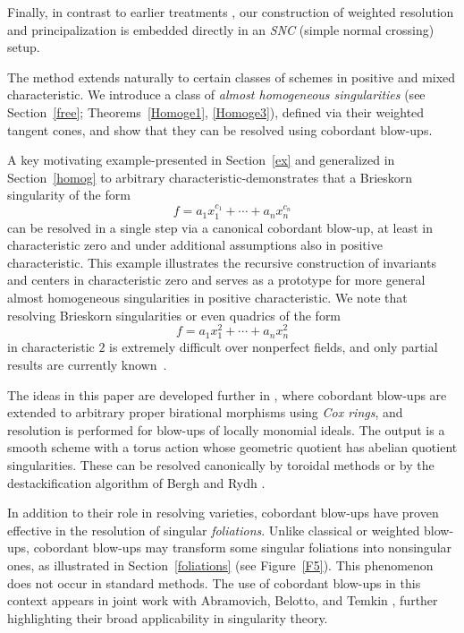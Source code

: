 \documentclass{amsart}
\begin{document}
Finally, in contrast to earlier treatments \cite{Marzo-McQuillan, ATW-weighted}, our construction of weighted resolution and principalization is embedded directly in an \emph{SNC} (simple normal crossing) setup.

The method extends naturally to certain classes of schemes in positive and mixed characteristic. We introduce a class of \emph{almost homogeneous singularities} (see Section~\ref{free}; Theorems~\ref{Homoge1}, \ref{Homoge3}), defined via their weighted tangent cones, and show that they can be resolved using cobordant blow-ups.

A key motivating example-presented in Section~\ref{ex} and generalized in Section~\ref{homog} to arbitrary characteristic-demonstrates that a Brieskorn singularity of the form
\[
f = a_1x_1^{c_1} + \cdots + a_n x_n^{c_n}
\]
can be resolved in a single step via a canonical cobordant blow-up, at least in characteristic zero and under additional assumptions  also in positive characteristic. This example illustrates the recursive construction of invariants and centers in characteristic zero and serves as a prototype for more general almost homogeneous singularities in positive characteristic. We note that resolving Brieskorn singularities or even quadrics  of the form \[
f = a_1x_1^{2} + \cdots + a_n x_n^{2}
\] in characteristic $2$ is extremely difficult over nonperfect fields, and only partial results are currently known~\cite{CPS}.

The ideas in this paper are developed further in \cite{Wlodarczyk-Cox}, where cobordant blow-ups are extended to arbitrary proper birational morphisms using \emph{Cox rings}, and resolution is performed for blow-ups of locally monomial ideals. The output is a smooth scheme with a torus action whose geometric quotient has abelian quotient singularities. These can be resolved canonically by toroidal methods \cite{Wlodarczyk-functorial-toroidal} or by the destackification algorithm of Bergh and Rydh \cite{Bergh-Rydh}.

In addition to their role in resolving varieties, cobordant blow-ups have proven effective in the resolution of singular \emph{foliations}. Unlike classical or weighted blow-ups, cobordant blow-ups may transform some  singular foliations into  nonsingular ones, as illustrated in Section~\ref{foliations} (see Figure~\ref{F5}). This phenomenon does not occur in standard methods. The use of cobordant blow-ups in this context  appears in joint work with Abramovich, Belotto, and Temkin \cite{ABTW25}, further highlighting their broad applicability in singularity theory.
\end{document}
